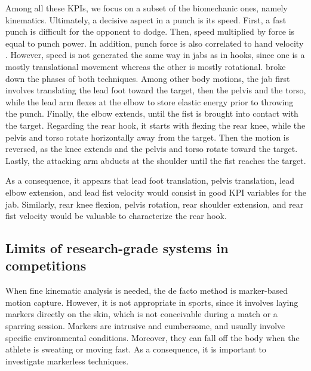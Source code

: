 Among all these KPIs, we focus on a subset of the biomechanic ones, namely kinematics. Ultimately, a decisive aspect in a punch is its speed. First, a fast punch is difficult for the opponent to dodge. Then, speed multiplied by force is equal to punch power. In addition, punch force is also correlated to hand velocity \cite{Mack2010}. However, speed is not generated the same way in jabs as in hooks, since one is a mostly translational movement whereas the other is mostly rotational. \cite{Lenetsky2020} broke down the phases of both techniques. Among other body motions, the jab first involves translating the lead foot toward the target, then the pelvis and the torso, while the lead arm flexes at the elbow to store elastic energy prior to throwing the punch. Finally, the elbow extends, until the fist is brought into contact with the target. Regarding the rear hook, it starts with flexing the rear knee, while the pelvis and torso rotate horizontally away from the target. Then the motion is reversed, as the knee extends and the pelvis and torso rotate toward the target. Lastly, the attacking arm abducts at the shoulder until the fist reaches the target. 

As a consequence, it appears that lead foot translation, pelvis translation, lead elbow extension, and lead fist velocity would consist in good KPI variables for the jab. Similarly, rear knee flexion, pelvis rotation, rear shoulder extension, and rear fist velocity would be valuable to characterize the rear hook. 

\newpage

\subsection{Limits of research-grade systems in competitions}

When fine kinematic analysis is needed, the de facto method is marker-based motion capture. However, it is not appropriate in sports, since it involves laying markers directly on the skin, which is not conceivable during a match or a sparring session. Markers are intrusive and cumbersome, and usually involve specific environmental conditions. Moreover, they can fall off the body when the athlete is sweating or moving fast. As a consequence, it is important to investigate markerless techniques. 


